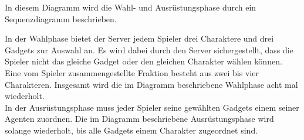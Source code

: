 In diesem Diagramm wird die Wahl- und Ausrüstungsphase durch ein Sequenzdiagramm beschrieben.\\


In der Wahlphase bietet der Server jedem Spieler drei Charaktere und drei Gadgets zur Auswahl an. 
Es wird dabei durch den Server sichergestellt, dass die Spieler nicht das gleiche Gadget oder den gleichen Charakter wählen können.\\
Eine vom Spieler zusammengestellte Fraktion besteht aus zwei bis vier Charakteren.
Insgesamt wird die im Diagramm beschriebene Wahlphase acht mal wiederholt.\\

In der Ausrüstungsphase muss jeder Spieler seine gewählten Gadgets einem seiner Agenten zuordnen. Die im Diagramm beschriebene Ausrüstungsphase wird solange wiederholt, bis alle Gadgets einem Charakter zugeordnet sind.
